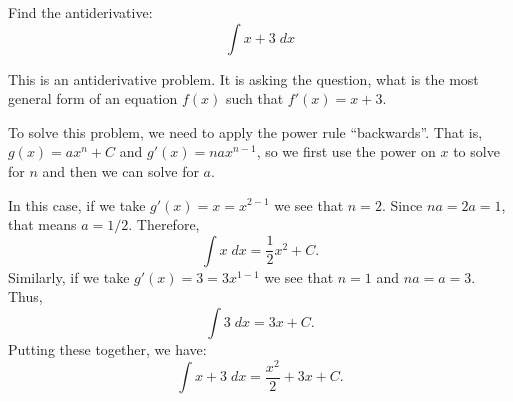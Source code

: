 \documentclass{ximera}
\author{Emma Smith Zbarsky}
\begin{document}
\begin{exercise}

Find the antiderivative: \[\int x+3\; dx\]


\begin{hint}
This is an antiderivative problem. It is asking the question, what is
the most general form of an equation $f(x)$ such that $f'(x) = x+3$.
\end{hint}


\begin{hint}
To solve this problem, we need to apply the power rule ``backwards''.
That is, $g(x) = ax^n+C$ and $g'(x) = nax^{n-1}$, so we first use the
power on $x$ to solve for $n$ and then we can solve for $a$.

In this case, if we take $g'(x) = x = x^{2-1}$ we see that $n=2$. Since
$na=2a=1$, that means $a=1/2$. Therefore,
\[\int x \; dx = \frac{1}{2}x^2+C.\] Similarly, if we take
$g'(x) = 3 = 3x^{1-1}$ we see that $n=1$ and $na = a = 3$. Thus,
\[\int 3\; dx = 3x+C.\] Putting these together, we have:
\[\int x+3 \; dx = \frac{x^2}{2}+3x+C.\]
\end{hint}


\begin{multipleChoice}
\end{multipleChoice}

\end{exercise}
\end{document}
